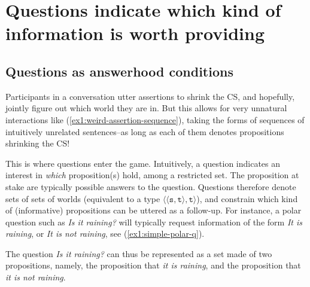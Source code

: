 \section{Questions indicate which kind of information is worth providing}\label{sec:questions}

\subsection{Questions as answerhood conditions}
Participants in a conversation utter assertions to shrink the CS, and hopefully, jointly figure out which world they are in. But this allows for very unnatural interactions like (\ref{ex1:weird-assertion-sequence}), taking the forms of sequences of intuitively unrelated sentences--as long as each of them denotes propositions shrinking the CS!

\begin{exe}
	\label{ex1:weird-assertion-sequence}
\end{exe}

This is where questions enter the game. Intuitively, a question indicates an interest in \textit{which} proposition(s) hold, among a restricted set. The proposition at stake are typically possible answers to the question. Questions therefore denote sets of sets of worlds (equivalent to a type $\langle\langle \texttt{s}, \texttt{t}\rangle, \texttt{t}\rangle$), and constrain which kind of (informative) propositions can be uttered as a follow-up. For instance, a polar question such as \textit{Is it raining?} will typically request information of the form \textit{It is raining}, or \textit{It is not raining}, see (\ref{ex1:simple-polar-q}). 

\begin{exe}
	\label{ex1:simple-polar-q}
\end{exe} 

The question \textit{Is it raining?} can thus be represented as a set made of two propositions, namely, the proposition that \textit{it is raining}, and the proposition that \textit{it is not raining}.  

\begin{exe}
\end{exe}


